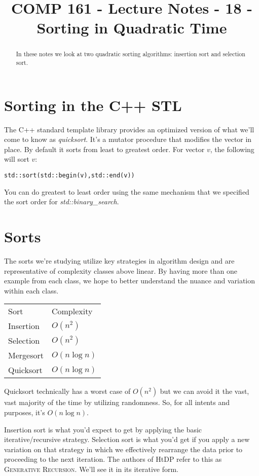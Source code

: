 \documentclass[]{tufte-handout}
\title{COMP 161 - Lecture Notes - 18 - Sorting in Quadratic Time}
\begin{document}
 
\maketitle

\begin{abstract}
In these notes we look at two quadratic sorting algorithms: insertion sort and selection sort.
\end{abstract}

\section{Sorting in the C++ STL}

The C++ standard template library provides an optimized version of what we'll come to know as \textit{quicksort}. It's a mutator procedure that modifies the vector in place. By default it sorts from least to greatest order. For vector $v$, the following will sort $v$:
\begin{verbatim}
std::sort(std::begin(v),std::end(v))
\end{verbatim}
You can do greatest to least order using the same mechanism that we specified the sort order for \textit{std::binary\_search}.

\section{Sorts}

The sorts we're studying utilize key strategies in algorithm design and are representative of complexity classes above linear.  By having more than one example from each class, we hope to better understand the nuance and variation within each class. 

\begin{tabular}{ll}
Sort & Complexity \\
Insertion & $O(n^2)$\\
Selection & $O(n^2)$\\ 
Mergesort & $O(n\log{n})$\\
Quicksort & $O(n\log{n})$
\end{tabular}

Quicksort technically has a worst case of $O(n^2)$ but we can avoid it the vast, vast majority of the time by utilizing randomness. So, for all intents and purposes, it's $O(n\log{n})$. 

Insertion sort is what you'd expect to get by applying the basic iterative/recursive strategy. Selection sort is what you'd get if you apply a new variation on that strategy in which we effectively rearrange the data prior to proceeding to the next iteration. The authors of HtDP refer to this as \textsc{Generative Recursion}. We'll see it in its iterative form.
\end{document}
